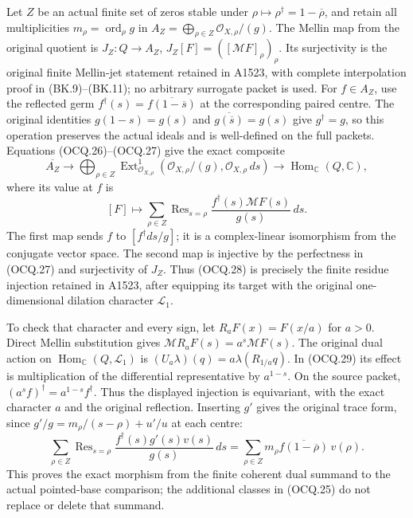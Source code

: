 Let $Z$ be an actual finite set of zeros stable under
$\rho\mapsto\rho^\dagger=1-\overline\rho$, and retain all multiplicities
$m_\rho=\operatorname{ord}_\rho g$ in
$A_Z=\bigoplus_{\rho\in Z}\mathcal O_{X,\rho}/(g)$.
The Mellin map from the original quotient is
$J_Z:Q\to A_Z$, $J_Z[F]=([\mathcal MF]_\rho)_\rho$.
Its surjectivity is the original finite Mellin-jet statement retained
in A1523, with complete interpolation proof in (BK.9)--(BK.11);
no arbitrary surrogate packet is used.
For $f\in A_Z$, use the reflected germ
$f^\dagger(s)=\overline{f(1-\overline s)}$ at the corresponding paired
centre.  The original identities $g(1-s)=g(s)$ and
$\overline{g(\overline s)}=g(s)$ give $g^\dagger=g$, so this operation
preserves the actual ideals and is well-defined on the full packets.
Equations (OCQ.26)--(OCQ.27) give the exact composite
\[
 \overline{A_Z}\longrightarrow
 \bigoplus_{\rho\in Z}\operatorname{Ext}^1_{\mathcal O_{X,\rho}}
           (\mathcal O_{X,\rho}/(g),\mathcal O_{X,\rho}\,ds)
 \longrightarrow\operatorname{Hom}_{\mathbb C}(Q,\mathbb C),
                                                               \tag{OCQ.28}
\]
where its value at $f$ is
\[
 [F]\longmapsto
       \sum_{\rho\in Z}\operatorname{Res}_{s=\rho}
              \frac{f^\dagger(s)\mathcal MF(s)}{g(s)}\,ds.      \tag{OCQ.29}
\]
The first map sends $f$ to $[f^\dagger ds/g]$; it is a complex-linear
isomorphism from the conjugate vector space.  The second map is
injective by the perfectness in (OCQ.27) and surjectivity of $J_Z$.
Thus (OCQ.28) is precisely the finite residue injection retained in
A1523, after equipping its target with the original one-dimensional
dilation character $\mathcal L_1$.

To check that character and every sign, let
$R_aF(x)=F(x/a)$ for $a>0$.  Direct Mellin substitution gives
$\mathcal M R_aF(s)=a^s\mathcal MF(s)$.
The original dual action on $\operatorname{Hom}_{\mathbb C}(Q,\mathcal L_1)$
is $(U_a\lambda)(q)=a\lambda(R_{1/a}q)$.  In (OCQ.29) its effect
is multiplication of the differential representative by $a^{1-s}$.
On the source packet, $(a^sf)^\dagger=a^{1-s}f^\dagger$.
Thus the displayed injection is equivariant, with the exact character
$a$ and the original reflection.
Inserting $g'$ gives the original trace form, since
$g'/g=m_\rho/(s-\rho)+u'/u$ at each centre:
\[
 \sum_{\rho\in Z}\operatorname{Res}_{s=\rho}
           \frac{f^\dagger(s)g'(s)v(s)}{g(s)}\,ds
   =\sum_{\rho\in Z}m_\rho
             \overline{f(1-\overline\rho)}\,v(\rho).          \tag{OCQ.30}
\]
This proves the exact morphism from the finite coherent dual summand
to the actual pointed-base comparison; the additional classes in
(OCQ.25) do not replace or delete that summand.

